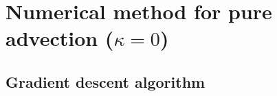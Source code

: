 %
%
%
%
%

\section{Numerical method for pure advection ($\kappa = 0$)}
\label{sec:numerical_method}

\subsection{Gradient descent algorithm}
%

